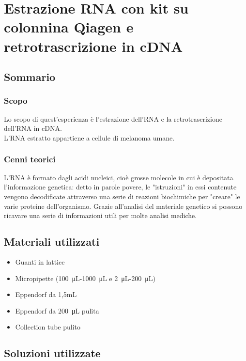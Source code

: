 \chapter{Estrazione RNA con kit su colonnina Qiagen e retrotrascrizione in cDNA} %

\section{Sommario}

\subsection{Scopo}
Lo scopo di quest'esperienza è l'estrazione dell'RNA e la retrotrascrizione dell'RNA in cDNA. \\
L'RNA estratto appartiene a cellule di melanoma umane.

\subsection{Cenni teorici}

L'RNA è formato dagli acidi nucleici, cioè grosse molecole in cui è depositata
l'informazione genetica: detto in parole povere, le "istruzioni" in essi contenute
vengono decodificate attraverso una serie di reazioni biochimiche per "creare" le varie proteine dell'organismo.
Grazie all'analisi del materiale genetico si possono ricavare una serie di informazioni utili per molte analisi mediche.

\section{Materiali utilizzati}

\begin{itemize}
\item Guanti in lattice
\item Micropipette (\SI{100}{\micro\liter}-\SI{1000}{\micro\liter} e \SI{2}{\micro\liter}-\SI{200}{\micro\liter})
\item Eppendorf da 1,5mL
\item Eppendorf da \SI{200}{\micro\liter} pulita
\item Collection tube pulito
\end{itemize}

\section{Soluzioni utilizzate}

